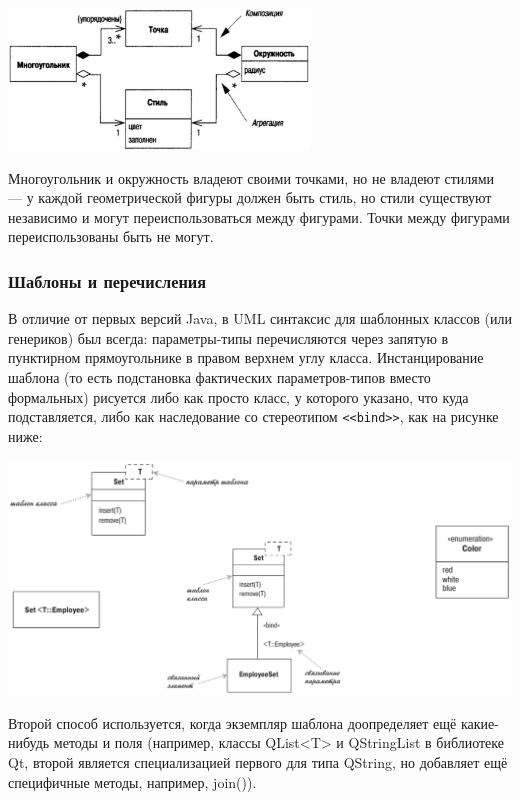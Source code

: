 \documentclass{../../text-style}
\begin{document}
\begin{center}
    \includegraphics[width=0.6\textwidth]{aggregationAndCompositionExample.png}
\end{center}

Многоугольник и окружность владеют своими точками, но не владеют стилями --- у каждой геометрической фигуры должен быть стиль, но стили существуют независимо и могут переиспользоваться между фигурами. Точки между фигурами переиспользованы быть не могут.

\subsubsection{Шаблоны и перечисления}

В отличие от первых версий Java, в UML синтаксис для шаблонных классов (или генериков) был всегда: параметры-типы перечисляются через запятую в пунктирном прямоугольнике в правом верхнем углу класса. Инстанцирование шаблона (то есть подстановка фактических параметров-типов вместо формальных) рисуется либо как просто класс, у которого указано, что куда подставляется, либо как наследование со стереотипом \verb|<<bind>>|, как на рисунке ниже:

\begin{center}
    \includegraphics[width=\textwidth]{genericsAndEnums.png}
\end{center}

Второй способ используется, когда экземпляр шаблона доопределяет ещё какие-нибудь методы и поля (например, классы QList<T> и QStringList в библиотеке Qt, второй является специализацией первого для типа QString, но добавляет ещё специфичные методы, например, join()).
\end{document}
